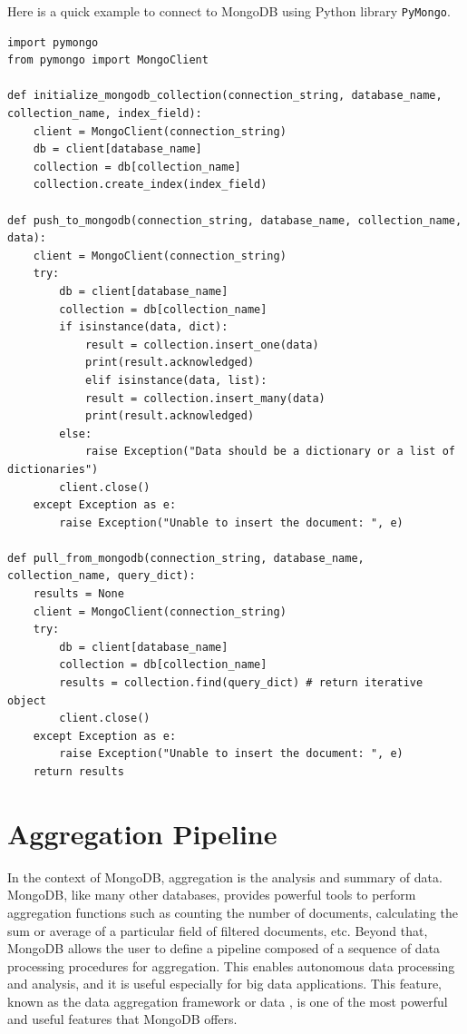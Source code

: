 Here is a quick example to connect to MongoDB using Python library \verb|PyMongo|.
\begin{lstlisting}
import pymongo
from pymongo import MongoClient

def initialize_mongodb_collection(connection_string, database_name, collection_name, index_field):
	client = MongoClient(connection_string)
	db = client[database_name]
	collection = db[collection_name]
	collection.create_index(index_field)

def push_to_mongodb(connection_string, database_name, collection_name, data):
	client = MongoClient(connection_string)
	try:
		db = client[database_name]
		collection = db[collection_name]
		if isinstance(data, dict):
			result = collection.insert_one(data)
			print(result.acknowledged)
			elif isinstance(data, list):
			result = collection.insert_many(data)
			print(result.acknowledged)
		else:
			raise Exception("Data should be a dictionary or a list of dictionaries")
		client.close()
	except Exception as e:
		raise Exception("Unable to insert the document: ", e)

def pull_from_mongodb(connection_string, database_name, collection_name, query_dict):
	results = None
	client = MongoClient(connection_string)
	try:
		db = client[database_name]
		collection = db[collection_name]
		results = collection.find(query_dict) # return iterative object
		client.close()
	except Exception as e:
		raise Exception("Unable to insert the document: ", e)
	return results

\end{lstlisting}

\section{Aggregation Pipeline}

In the context of MongoDB, aggregation is the analysis and summary of data. MongoDB, like many other databases, provides powerful tools to perform aggregation functions such as counting the number of documents, calculating the sum or average of a particular field of filtered documents, etc. Beyond that, MongoDB allows the user to define a pipeline composed of a sequence of data processing procedures for aggregation. This enables autonomous data processing and analysis, and it is useful especially for big data applications. This feature, known as the data aggregation framework or data , is one of the most powerful and useful features that MongoDB offers.

